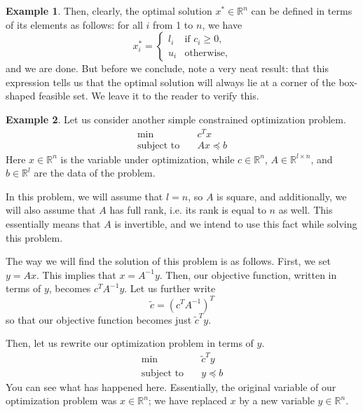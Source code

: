 \documentclass[a4paper]{article}
\theoremstyle{definition}
\newtheorem{example}{Example}[section]
\begin{document}
\begin{example}
	Then, clearly, the optimal solution $x^* \in \mathbb{R}^n$ can be defined in terms of its elements as follows: for all $i$ from 1 to $n$, we have
	\begin{equation*}
		x_i^* =
		\begin{cases}
			l_i & \text{if } c_i \geq 0, \\
			u_i & \text{otherwise},
		\end{cases}
	\end{equation*}
	and we are done.
	But before we conclude, note a very neat result: that this expression tells us that the optimal solution will always lie at a corner of the box-shaped feasible set.
	We leave it to the reader to verify this.
\end{example}

\begin{example}
	Let us consider another simple constrained optimization problem.
	\begin{align*}
		\min \quad & c^T x \\
		\text{subject to} \quad & Ax \preceq b
	\end{align*}
	Here $x \in \mathbb{R}^n$ is the variable under optimization, while $c \in \mathbb{R}^n$, $A \in \mathbb{R}^{l \times n}$, and $b \in \mathbb{R}^l$ are the data of the problem.

	In this problem, we will assume that $l = n$, so $A$ is square, and additionally, we will also assume that $A$ has full rank, i.e. its rank is equal to $n$ as well.
	This essentially means that $A$ is invertible, and we intend to use this fact while solving this problem.

	The way we will find the solution of this problem is as follows.
	First, we set $y = Ax$.
	This implies that $x = A^{-1} y$.
	Then, our objective function, written in terms of $y$, becomes $c^T A^{-1} y$.
	Let us further write
	\begin{equation*}
		\tilde{c} = ( c^T A^{-1} )^T
	\end{equation*}
	so that our objective function becomes just $\tilde{c}^T y$.

	Then, let us rewrite our optimization problem in terms of $y$.
	\begin{align*}
		\min \quad & \tilde{c}^T y \\
		\text{subject to} \quad & y \preceq b
	\end{align*}
	You can see what has happened here.
	Essentially, the original variable of our optimization problem was $x \in \mathbb{R}^n$; we have replaced $x$ by a new variable $y \in \mathbb{R}^n$.


\end{example}
\end{document}
